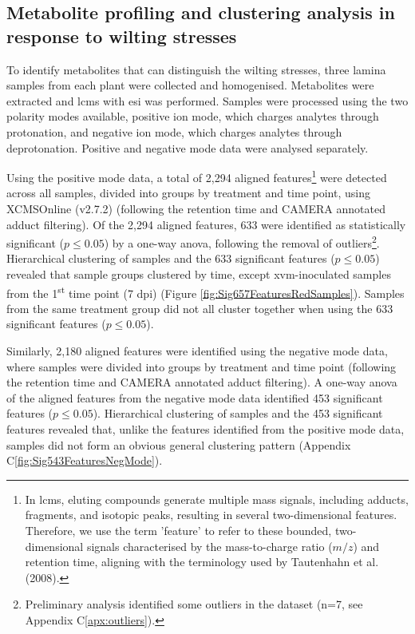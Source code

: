 \subsection{Metabolite profiling and clustering analysis in response to wilting stresses}

To identify metabolites that can distinguish the wilting stresses, three lamina samples from each plant were collected and homogenised. Metabolites were extracted and \ac{lcms} with \ac{esi} was performed. Samples were processed using the two polarity modes available, positive ion mode, which charges analytes through protonation, and negative ion mode, which charges analytes through deprotonation. Positive and negative mode data were analysed separately. 

Using the positive mode data, a total of 2,294 aligned features\footnote{In \ac{lcms}, eluting compounds generate multiple mass signals, including adducts, fragments, and isotopic peaks, resulting in several two-dimensional features. Therefore, we use the term 'feature' to refer to these bounded, two-dimensional signals characterised by the mass-to-charge ratio ($m/z$) and retention time, aligning with the terminology used by Tautenhahn et al. (2008).} were detected across all samples, divided into groups by treatment and time point, using XCMSOnline (v2.7.2) \parencite{Gowda2014} (following the retention time and CAMERA annotated adduct filtering). Of the 2,294 aligned features, 633 were identified as statistically significant ($p \le0.05$) by a one-way \ac{anova}, following the removal of outliers\footnote{Preliminary analysis identified some outliers in the dataset (n=7, see Appendix C\ref{apx:outliers}).}. Hierarchical clustering of samples and the 633 significant features ($p \le0.05$) revealed that sample groups clustered by time, except \ac{xvm}-inoculated samples from the 1\textsuperscript{st} time point (7 \ac{dpi}) (Figure \ref{fig:Sig657FeaturesRedSamples}). Samples from the same treatment group did not all cluster together when using the 633 significant features ($p \le0.05$).

Similarly, 2,180 aligned features were identified using the negative mode data, where samples were divided into groups by treatment and time point (following the retention time and CAMERA annotated adduct filtering). A one-way \ac{anova} of 
the aligned features from the negative mode data identified 453 significant features ($p \le0.05$). Hierarchical clustering of samples and the 453 significant features revealed that, unlike the features identified from the positive mode data, samples did not form an obvious general clustering pattern (Appendix C\ref{fig:Sig543FeaturesNegMode}). 
 
